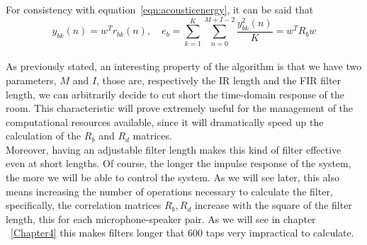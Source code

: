 For consistency with equation~\ref{eqn:acousticenergy}, it can be said that \parencite{cai_time-domain_2014}
\[ y_{bk}(n)=w^T r_{bk}(n), \quad e_b=\sum\limits_{k=1}^{K}\sum\limits_{n=0}^{M+I-2}\frac{y_{bk}^2(n)}{K} = w^T R_b w\]
\\
As previously stated, an interesting property of the algorithm is that we have two parameters, $M$ and $I$, those are, respectively the IR length and the FIR filter length, we can arbitrarily decide to cut short the time-domain response of the room. This characteristic will prove extremely useful for the management of the computational resources available, since it will dramatically speed up the calculation of the $R_b$ and $R_d$ matrices.
\\
Moreover, having an adjustable filter length makes this kind of filter effective even at short lengths. Of course, the longer the impulse response of the system, the more we will be able to control the system. As we will see later, this also means increasing the number of operations necessary to calculate the filter, specifically, the correlation matrices $R_b, R_d$ increase with the square of the filter length, this for each microphone-speaker pair. As we will see in chapter ~\ref{Chapter4} this makes filters longer that 600 taps very impractical to calculate.

